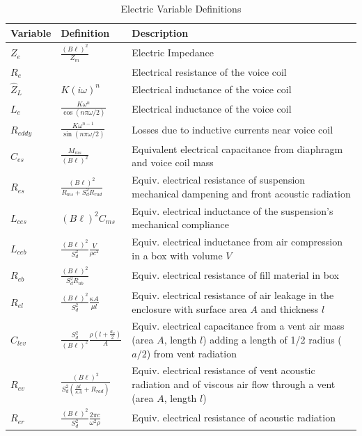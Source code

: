 \documentclass[10pt]{book}
\begin{document}
\begin{table}
\centering
\renewcommand{\arraystretch}{1.5}
\begin{tabularx}{\textwidth}{@{} ll X @{}}
\toprule
Variable & Definition & Description \\
\midrule
$Z_e$ & $\frac{(B\ell)^2}{Z_m}$ & Electric Impedance\\
$R_e$ &  & Electrical resistance of the voice coil\\
$\hat{Z}_L$ & $K(i\omega)^n$ & Electrical inductance of the voice coil\\
$L_e$ & $\frac{K\omega^{n}}{\cos(n\pi\omega/2)}$ & Electrical inductance of the voice coil\\
$R_{eddy}$ & $\frac{K\omega^{n-1}}{\sin(n\pi\omega/2)}$ & Losses due to inductive currents near voice coil\\
$C_{es}$ & $\frac{M_{ms}}{(B\ell)^2}$ & Equivalent electrical capacitance from diaphragm and voice coil mass\\
$R_{es}$ & $\frac{(B\ell)^2}{R_{ms}+S_d^2R_{rad}}$ & Equiv. electrical resistance of suspension mechanical dampening and front acoustic radiation\\
$L_{ces}$ & $(B\ell)^2C_{ms}$ & Equiv. electrical inductance of the suspension's mechanical compliance\\
$L_{ceb}$ & $\frac{(B\ell)^2}{S_d^2} \frac{V}{\rho c^2}$ & Equiv. electrical inductance from air compression in a box with volume $V$\\
$R_{eb}$ & $\frac{(B\ell)^2}{S_d^2 R_{ab}}$ & Equiv. electrical resistance of fill material in box\\
$R_{el}$ & $\frac{(B\ell)^2}{S_d^2 } \frac{\kappa A}{\mu l}$ & Equiv. electrical resistance of air leakage in the enclosure with surface area $A$ and thickness $l$\\
$C_{lev}$ & $\frac{S_d^2}{(B\ell)^2}\frac{\rho \left(l+\frac{a_v}{2}\right)}{A}$ & Equiv. electrical capacitance from a vent air mass (area $A$, length $l$) adding a length of 1/2 radius ($a/2$) from vent radiation\\
$R_{ev}$ & $\frac{(B\ell)^2}{S_d^2\left( \frac{\mu l}{\kappa A}+R_{rad}\right)}$ & Equiv. electrical resistance of vent acoustic radiation and of viscous air flow through a vent (area $A$, length $l$)\\
$R_{er}$ & $\frac{(B\ell)^2}{S_d^2}\frac{2\pi c}{\omega^2 \rho}$& Equiv. electrical resistance of acoustic radiation\\
\bottomrule
\end{tabularx}
\caption{Electric Variable Definitions}\label{table:variables}
\end{table}
\end{document}

